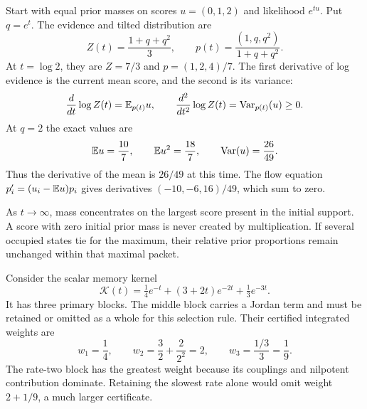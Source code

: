 Start with equal prior masses on scores $u=(0,1,2)$ and likelihood $e^{tu}$. Put $q=e^t$. The evidence and tilted distribution are
\[
Z(t)=\frac{1+q+q^2}{3},\qquad
p(t)=\frac{(1,q,q^2)}{1+q+q^2}.
\]
At $t=\log2$, they are $Z=7/3$ and $p=(1,2,4)/7$.
The first derivative of log evidence is the current mean score, and the second is its variance:
\[
\frac{d}{dt}\log Z(t)=\EE_{p(t)}u,
\qquad
\frac{d^2}{dt^2}\log Z(t)=\Var_{p(t)}(u)\ge0.
\]
At $q=2$ the exact values are
\[
\EE u=\frac{10}{7},\qquad
\EE u^2=\frac{18}{7},\qquad
\Var(u)=\frac{26}{49}.
\]
Thus the derivative of the mean is $26/49$ at this time. The flow equation $p_i'=(u_i-\EE u)p_i$ gives derivatives $(-10,-6,16)/49$, which sum to zero.

As $t\to\infty$, mass concentrates on the largest score present in the initial support. A score with zero initial prior mass is never created by multiplication. If several occupied states tie for the maximum, their relative prior proportions remain unchanged within that maximal packet.

Consider the scalar memory kernel
\[
\mathcal K(t)=\tfrac14e^{-t}+(3+2t)e^{-2t}+\tfrac13e^{-3t}.
\]
It has three primary blocks. The middle block carries a Jordan term and must be retained or omitted as a whole for this selection rule. Their certified integrated weights are
\[
w_1=\frac14,\qquad w_2=\frac32+\frac{2}{2^2}=2,
\qquad w_3=\frac{1/3}{3}=\frac19.
\]
The rate-two block has the greatest weight because its couplings and nilpotent contribution dominate. Retaining the slowest rate alone would omit weight $2+1/9$, a much larger certificate.

